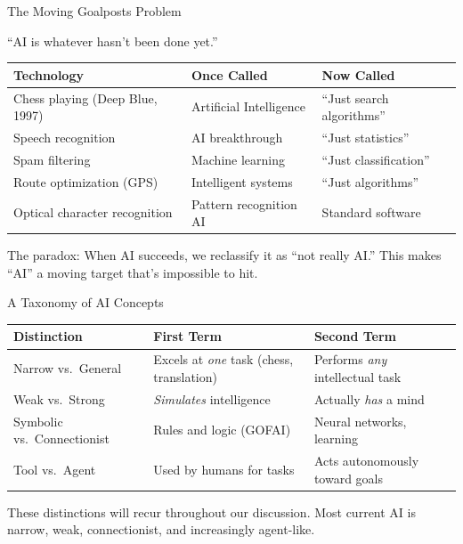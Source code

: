 ﻿\documentclass[aspectratio=169,11pt]{beamer}
\begin{document}
\begin{frame}{The Moving Goalposts Problem}
\begin{quotebox}
``AI is whatever hasn't been done yet.''
\end{quotebox}

\vspace{0.2em}
\begin{table}[h]
\centering
\scriptsize
\begin{tabular}{@{}lll@{}}
\toprule
\textbf{Technology} & \textbf{Once Called} & \textbf{Now Called} \\
\midrule
Chess playing (Deep Blue, 1997) & Artificial Intelligence & ``Just search algorithms'' \\
Speech recognition & AI breakthrough & ``Just statistics'' \\
Spam filtering & Machine learning & ``Just classification'' \\
Route optimization (GPS) & Intelligent systems & ``Just algorithms'' \\
Optical character recognition & Pattern recognition AI & Standard software \\
\bottomrule
\end{tabular}
\end{table}

\vspace{0.2em}
The paradox: When AI succeeds, we reclassify it as ``not really AI.'' This makes ``AI'' a moving target that's impossible to hit.
\end{frame}

\begin{frame}{A Taxonomy of AI Concepts}
\begin{table}[h]
\centering
\small
\begin{tabular}{@{}p{3cm}p{5cm}p{5cm}@{}}
\toprule
\textbf{Distinction} & \textbf{First Term} & \textbf{Second Term} \\
\midrule
Narrow vs.\ General & Excels at \emph{one} task (chess, translation) & Performs \emph{any} intellectual task \\
\addlinespace
Weak vs.\ Strong & \emph{Simulates} intelligence & Actually \emph{has} a mind \\
\addlinespace
Symbolic vs.\ Connectionist & Rules and logic (GOFAI) & Neural networks, learning \\
\addlinespace
Tool vs.\ Agent & Used by humans for tasks & Acts autonomously toward goals \\
\bottomrule
\end{tabular}
\end{table}

\vspace{0.2em}
These distinctions will recur throughout our discussion. Most current AI is narrow, weak, connectionist, and increasingly agent-like.
\end{frame}
\end{document}
